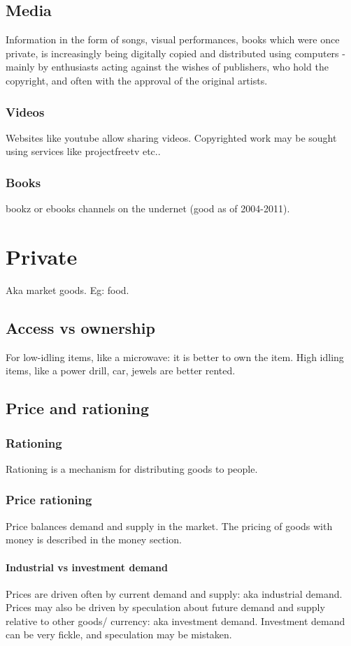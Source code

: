 \documentclass[oneside, article]{memoir}
\begin{document}
\subsection{Media}
Information in the form of songs, visual performances, books which were once private, is increasingly being digitally copied and distributed using computers - mainly by enthusiasts acting against the wishes of publishers, who hold the copyright, and often with the approval of the original artists.

\subsubsection{Videos}
Websites like youtube allow sharing videos. Copyrighted work may be sought using services like projectfreetv etc..

\subsubsection{Books}
bookz or ebooks channels on the undernet (good as of 2004-2011).

\section{Private}
Aka market goods. Eg: food.

\subsection{Access vs ownership}
For low-idling items, like a microwave: it is better to own the item. High idling items, like a power drill, car, jewels are better rented.

\subsection{Price and rationing}
\subsubsection{Rationing}
Rationing is a mechanism for distributing goods to people.

\subsubsection{Price rationing}
Price balances demand and supply in the market. The pricing of goods with money is described in the money section.

\paragraph{Industrial vs investment demand}
Prices are driven often by current demand and supply: aka industrial demand. Prices may also be driven by speculation about future demand and supply relative to other goods/ currency: aka investment demand. Investment demand can be very fickle, and speculation may be mistaken.
\end{document}

